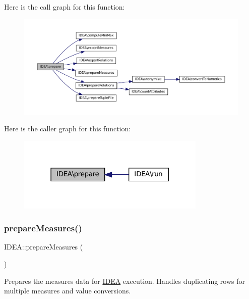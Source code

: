 Here is the call graph for this function\+:\nopagebreak
\begin{figure}[H]
\begin{center}
\leavevmode
\includegraphics[width=350pt]{class_i_d_e_a_af5672e1fd95ed4bacd0922478a3317f2_cgraph}
\end{center}
\end{figure}
Here is the caller graph for this function\+:\nopagebreak
\begin{figure}[H]
\begin{center}
\leavevmode
\includegraphics[width=255pt]{class_i_d_e_a_af5672e1fd95ed4bacd0922478a3317f2_icgraph}
\end{center}
\end{figure}
\mbox{\label{class_i_d_e_a_a236cabd79a85f11694d1a3fd2506a64b}} 
\subsubsection{\texorpdfstring{prepare\+Measures()}{prepareMeasures()}}
{\footnotesize\ttfamily I\+D\+E\+A\+::prepare\+Measures (\begin{DoxyParamCaption}{ }\end{DoxyParamCaption})\hspace{0.3cm}{\ttfamily [protected]}}

Prepares the measures data for \hyperlink{class_i_d_e_a}{I\+D\+EA} execution. Handles duplicating rows for multiple measures and value conversions. 

